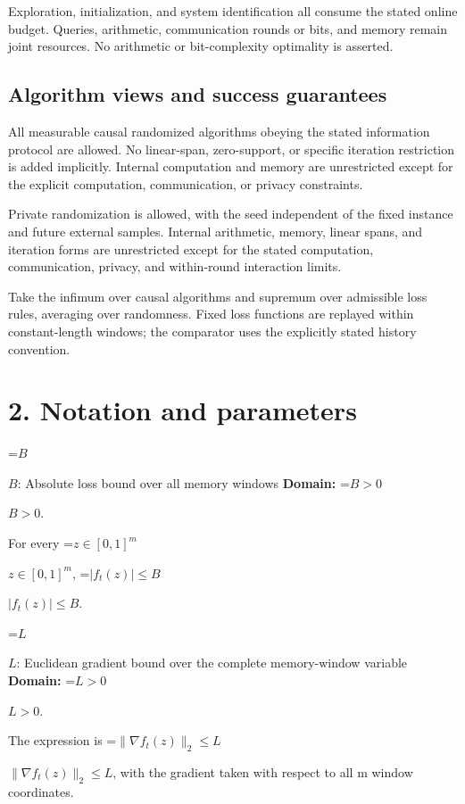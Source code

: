 \documentclass[10pt,a4paper]{article}
\newcommand{\AtlasMath}[1]{\par\begingroup\centering\setbox0=\hbox{$\displaystyle #1$}\ifdim\wd0>1.4\linewidth\typeout{ATLAS WIDE FORMULA: \the\wd0}\fi\ifdim\wd0>\linewidth\resizebox{\linewidth}{!}{\box0}\else\box0\fi\par\endgroup}
\newcommand{\AtlasInlineMath}[1]{\begingroup\setbox0=\hbox{$#1$}\ifdim\wd0>.4\linewidth\endgroup\AtlasMath{#1}\else\endgroup$#1$\fi}
\begin{document}
Exploration, initialization, and system identification all consume the stated online budget. Queries, arithmetic, communication rounds or bits, and memory remain joint resources. No arithmetic or bit-complexity optimality is asserted.



\subsection{Algorithm views and success guarantees}


All measurable causal randomized algorithms obeying the stated information protocol are allowed. No linear-span, zero-support, or specific iteration restriction is added implicitly. Internal computation and memory are unrestricted except for the explicit computation, communication, or privacy constraints.



Private randomization is allowed, with the seed independent of the fixed instance and future external samples. Internal arithmetic, memory, linear spans, and iteration forms are unrestricted except for the stated computation, communication, privacy, and within-round interaction limits.



Take the infimum over causal algorithms and supremum over admissible loss rules, averaging over randomness. Fixed loss functions are replayed within constant-length windows; the comparator uses the explicitly stated history convention.



\section{2. Notation and parameters}


\AtlasInlineMath{B}: Absolute loss bound over all memory windows \textbf{Domain:} \AtlasInlineMath{B>0}.



For every \AtlasInlineMath{z\in[0,1]^m}, \AtlasInlineMath{|f_t(z)|\le B}.



\AtlasInlineMath{L}: Euclidean gradient bound over the complete memory-window variable \textbf{Domain:} \AtlasInlineMath{L>0}.



The expression is \AtlasInlineMath{\|\nabla f_t(z)\|_2\le L}, with the gradient taken with respect to all m window coordinates.
\end{document}
